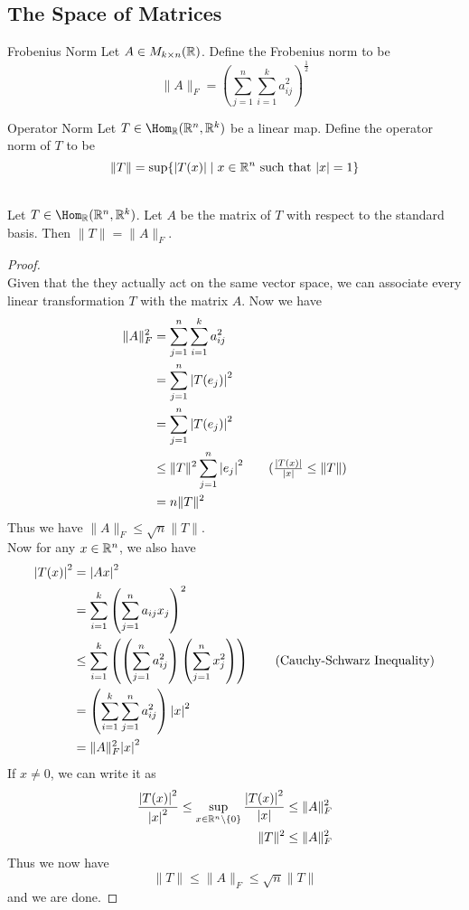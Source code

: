 \documentclass[a4paper]{article}
\begin{document}
\subsection{The Space of Matrices}
\begin{defn}{Frobenius Norm}{} Let $A\in M_{k\times n}(\mathbb{R})$. Define the Frobenius norm to be $$\|A\|_F=\left(\sum_{j=1}^n\sum_{i=1}^ka_{ij}^2\right)^{\frac{1}{2}}$$
\end{defn}
 
\begin{defn}{Operator Norm}{} Let $T\in\Hom_\R(\R^n,\R^k)$ be a linear map. Define the operator norm of $T$ to be $$\|T\|=\sup\{\abs{T(x)}\;|\;x\in\mathbb{R}^n\text{ such that }\abs{x}=1\}$$
\end{defn}

\begin{prp}{}{}\\
Let $T\in\Hom_\R(\R^n,\R^k)$. Let $A$ be the matrix of $T$ with respect to the standard basis. Then $\|T\|=\|A\|_F$. 
\begin{proof}\\
Given that the they actually act on the same vector space, we can associate every linear transformation $T$ with the matrix $A$. Now we have 
\begin{align*}
\|A\|_F^2&=\sum_{j=1}^n\sum_{i=1}^ka_{ij}^2\\
&=\sum_{j=1}^n\abs{T(e_j)}^2\\
&=\sum_{j=1}^n\abs{T(e_j)}^2\\
&\leq\|T\|^2\sum_{j=1}^n\abs{e_j}^2\tag{$\frac{\abs{T(x)}}{\abs{x}}\leq\|T\|$}\\
&=n\|T\|^2
\end{align*}
Thus we have $\|A\|_F\leq\sqrt{n}\|T\|$. \\
Now for any $x\in\mathbb{R}^n$, we also have 
\begin{align*}
\abs{T(x)}^2&=\abs{Ax}^2\\
&=\sum_{i=1}^k\left(\sum_{j=1}^na_{ij}x_j\right)^2\\
&\leq\sum_{i=1}^k\left(\left(\sum_{j=1}^na_{ij}^2\right)\left(\sum_{j=1}^nx_j^2\right)\right)\tag{Cauchy-Schwarz Inequality}\\
&=\left(\sum_{i=1}^k\sum_{j=1}^na_{ij}^2\right)\abs{x}^2\\
&=\|A\|_F^2\abs{x}^2
\end{align*}
If $x\neq 0$, we can write it as 
\begin{align*}
\frac{\abs{T(x)}^2}{\abs{x}^2}\leq\sup_{x\in\mathbb{R}^n\setminus\{0\}}\frac{\abs{T(x)}^2}{\abs{x}}&\leq\|A\|_F^2\\
\|T\|^2&\leq\|A\|_F^2
\end{align*}
Thus we now have $$\|T\|\leq\|A\|_F\leq\sqrt{n}\|T\|$$ and we are done. 
\end{proof}
\end{prp}
\end{document}
